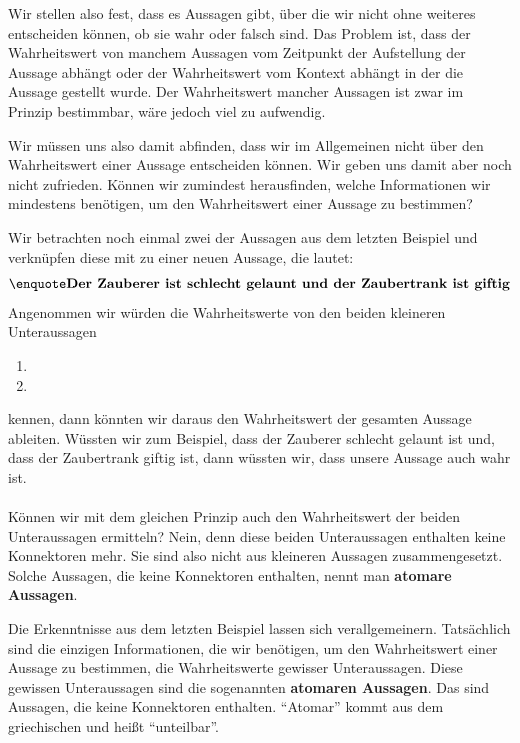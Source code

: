 \documentclass[../../main.tex]{subfiles}
\begin{document}
Wir stellen also fest, dass es Aussagen gibt, über die wir nicht ohne weiteres entscheiden können, ob sie wahr oder falsch sind. Das Problem ist, dass der Wahrheitswert von manchem Aussagen vom Zeitpunkt der Aufstellung der Aussage abhängt oder der Wahrheitswert vom Kontext abhängt in der die Aussage gestellt wurde. Der Wahrheitswert mancher Aussagen ist zwar im Prinzip bestimmbar, wäre jedoch viel zu aufwendig.

Wir müssen uns also damit abfinden, dass wir im Allgemeinen nicht über den Wahrheitswert einer Aussage entscheiden können. Wir geben uns damit aber noch nicht zufrieden. Können wir zumindest herausfinden, welche Informationen wir mindestens benötigen, um den Wahrheitswert einer Aussage zu bestimmen?

\begin{example}
Wir betrachten noch einmal zwei der Aussagen aus dem letzten Beispiel und verknüpfen diese mit  zu einer neuen Aussage, die lautet:
\[\statement{Der Zauberer ist schlecht gelaunt und der Zaubertrank ist giftig}\]
Angenommen wir würden die Wahrheitswerte von den beiden kleineren Unteraussagen
\begin{enumerate}
    \item {}
    \item {}
\end{enumerate}
kennen, dann könnten wir daraus den Wahrheitswert der gesamten Aussage ableiten. Wüssten wir zum Beispiel, dass der Zauberer schlecht gelaunt ist und, dass der Zaubertrank giftig ist, dann wüssten wir, dass unsere Aussage  auch wahr ist.
\\ \\
Können wir mit dem gleichen Prinzip auch den Wahrheitswert der beiden Unteraussagen ermitteln? Nein, denn diese beiden Unteraussagen enthalten keine Konnektoren mehr. Sie sind also nicht aus kleineren Aussagen zusammengesetzt. Solche Aussagen, die keine Konnektoren enthalten, nennt man \textbf{atomare Aussagen}.
\end{example}

Die Erkenntnisse aus dem letzten Beispiel lassen sich verallgemeinern. Tatsächlich sind die einzigen Informationen, die wir benötigen, um den Wahrheitswert einer Aussage zu bestimmen, die Wahrheitswerte gewisser Unteraussagen. Diese gewissen Unteraussagen sind die sogenannten \textbf{atomaren Aussagen}. Das sind Aussagen, die keine Konnektoren enthalten. \enquote{Atomar} kommt aus dem griechischen und heißt \enquote{unteilbar}.
\end{document}
